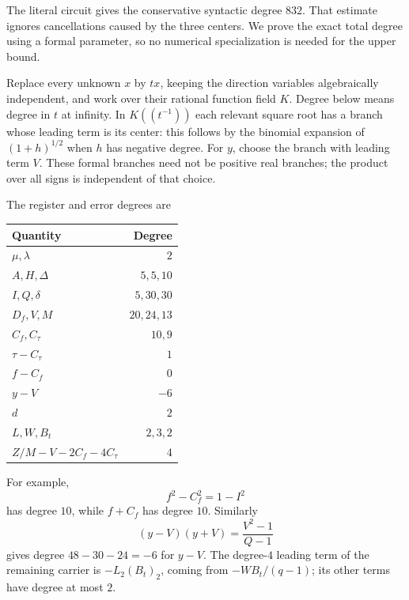 The literal circuit gives the conservative syntactic degree $832$.
That estimate ignores cancellations caused by the three centers.  We
prove the exact total degree using a formal parameter, so no numerical
specialization is needed for the upper bound.

Replace every unknown $x$ by $tx$, keeping the direction variables
algebraically independent, and work over their rational function field
$K$.  Degree below means degree in $t$ at infinity.  In $K((t^{-1}))$
each relevant square root has a branch whose leading term is its center:
this follows by the binomial expansion of $(1+h)^{1/2}$ when $h$ has
negative degree.  For $y$, choose the branch with leading term $V$.
These formal branches need not be positive real branches; the product
over all signs is independent of that choice.

The register and error degrees are
\begin{center}
\begin{tabular}{@{}lr@{}}
\toprule
Quantity & Degree\\
\midrule
$\mu,\lambda$ & $2$\\
$A,H,\Delta$ & $5,5,10$\\
$I,Q,\delta$ & $5,30,30$\\
$D_f,V,M$ & $20,24,13$\\
$C_f,C_\tau$ & $10,9$\\
$\tau-C_\tau$ & $1$\\
$f-C_f$ & $0$\\
$y-V$ & $-6$\\
$d$ & $2$\\
$L,W,B_t$ & $2,3,2$\\
$Z/M-V-2C_f-4C_\tau$ & $4$\\
\bottomrule
\end{tabular}
\end{center}
For example,
\[
 f^2-C_f^2=1-I^2
\]
has degree $10$, while $f+C_f$ has degree $10$.
Similarly
\[
 (y-V)(y+V)=\frac{V^2-1}{Q-1}
\]
gives degree $48-30-24=-6$ for $y-V$.
The degree-$4$ leading term of the remaining carrier is $-L_2(B_t)_2$,
coming from $-WB_t/(q-1)$; its other terms have degree at most $2$.

